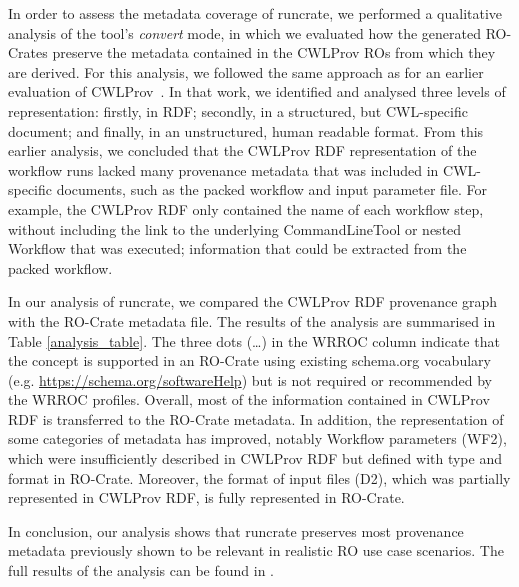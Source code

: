 \documentclass[10pt,letterpaper]{article}
\begin{document}
In order to assess the metadata coverage of runcrate, we performed a qualitative analysis of the tool's \emph{convert} mode, in which we evaluated how the generated RO-Crates preserve the metadata contained in the CWLProv ROs from which they are derived.
For this analysis, we followed the same approach as for an earlier evaluation of CWLProv~\cite{De Wit 2022}.
In that work, we identified and analysed three levels of representation:
firstly, in RDF; secondly, in a structured, but CWL-specific document;
and finally, in an unstructured, human readable format.
From this earlier analysis, we concluded that the CWLProv RDF representation of the workflow runs lacked many provenance metadata that was included in CWL-specific documents, such as the packed workflow and input parameter file.
For example, the CWLProv RDF only contained the name of each workflow step, without including the link to the underlying CommandLineTool or nested Workflow that was executed; information that could be extracted from the packed workflow.

In our analysis of runcrate, we compared the CWLProv RDF provenance graph with the RO-Crate metadata file. The results of the analysis are summarised in Table
\ref{analysis_table}.
The three dots (…) in the WRROC column indicate that  the concept is supported in an RO-Crate using existing schema.org vocabulary (e.g. \url{https://schema.org/softwareHelp}) but is not required or recommended by the WRROC profiles.
Overall, most of the information contained in CWLProv RDF is transferred to the RO-Crate metadata.
In addition, the representation of some categories of metadata has improved, notably Workflow parameters (WF2), which were insufficiently described in CWLProv RDF but defined with type and format in RO-Crate.
Moreover, the format of input files (D2), which was partially represented in CWLProv RDF, is fully represented in RO-Crate.

In conclusion, our analysis shows that runcrate preserves most provenance metadata previously shown to be relevant in realistic RO use case scenarios.
The full results of the analysis can be found in \cite{de Wit 2023}.
\end{document}
